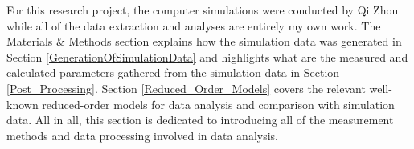 \noindent For this research project, the computer simulations were conducted by Qi Zhou\cite{2020Charles} while all of the data extraction and analyses are entirely my own work. The Materials \& Methods section explains how the simulation data was generated in Section \ref{GenerationOfSimulationData} and highlights what are the measured and calculated parameters gathered from the simulation data in Section \ref{Post_Processing}. Section \ref{Reduced_Order_Models} covers the relevant well-known reduced-order models for data analysis and comparison with simulation data. All in all, this section is dedicated to introducing all of the measurement methods and data processing involved in data analysis. 
